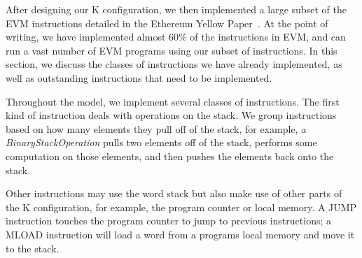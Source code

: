 After designing our K configuration, we then implemented a large subset of the
EVM instructions detailed in the Ethereum Yellow Paper~\cite{gavwood}. At the
point of writing, we have implemented almost 60\% of the instructions in EVM,
and can run a vast number of EVM programs using our subset of instructions. In
this section, we discuss the classes of instructions we have already implemented, as
well as outstanding instructions that need to be implemented.

Throughout the model, we implement several classes of instructions. The first
kind of instruction deals with operations on the stack. We group instructions
based on how many elements they pull off of the stack, for example, a
\textit{BinaryStackOperation} pulls two elements off of the stack, performs some
computation on those elements, and then pushes the elements back onto the stack.

Other instructions may use the word stack but also make use of other parts of
the K configuration, for example, the program counter or local memory. A JUMP
instruction touches the program counter to jump to previous instructions; a MLOAD
instruction will load a word from a program\textquotesingle s local memory and move it to the
stack.

